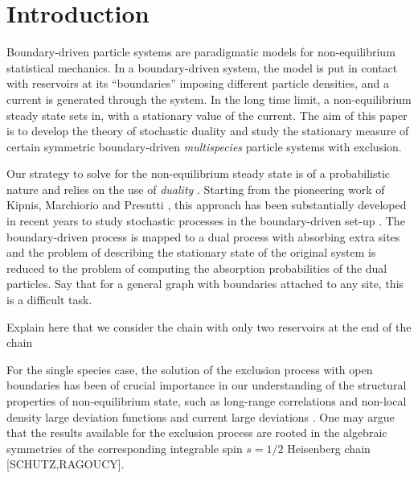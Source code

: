 \documentclass[10pt]{article}
\numberwithin{equation}{section}
\numberwithin{equation}{subsection}
\begin{document}

\newpage
\tableofcontents

 \newpage

\section{Introduction} 
Boundary-driven particle systems are paradigmatic models for non-equilibrium statistical mechanics. In a boundary-driven system, the model is put in contact with reservoirs at its ``boundaries'' imposing different particle densities, and a current is generated through the system. In the long time limit, a non-equilibrium steady state sets in, with a stationary value of the current.  The aim of this paper is to develop the theory of stochastic duality and  study the stationary measure of certain symmetric boundary-driven {\em multispecies} particle systems with exclusion.

Our strategy to solve for the non-equilibrium steady state is of a probabilistic nature and relies on the use of {\em duality} \cite{schutzSandow}. Starting from the pioneering work of Kipnis, Marchiorio and Presutti \cite{KMP}, this approach
has been substantially developed in recent years to study stochastic processes in the boundary-driven set-up \cite{giardina2009duality,carinci2013duality}.
The boundary-driven process is mapped to a dual process with absorbing extra sites and the problem of describing the stationary state of the original system
is reduced to the problem of computing the absorption probabilities of the dual particles.
{\color{red} Say that for a  general graph with boundaries attached to any site, this is a difficult task. }

{\color{red} Explain here that we consider the chain with only two reservoirs at the end of the chain}

For the single species case,  the solution of the exclusion process with open boundaries \cite{derrida1993exact,1993JSP....72..277S} has been of crucial importance in our understanding of the structural properties of non-equilibrium state, such as long-range correlations \cite{spohn1983long} and non-local density large deviation functions \cite{derrida2007non,derrida1998exact} and current large deviations \cite{mallick2022exact,bodineau2005current}. One may argue that the results available for the exclusion process are rooted in the algebraic symmetries of the corresponding integrable spin $s=1/2$ Heisenberg chain [SCHUTZ,RAGOUCY].
\end{document}
